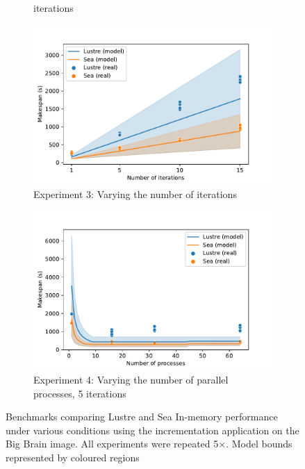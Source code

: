 \documentclass[10pt,journal,compsoc]{IEEEtran}
\begin{document}
\begin{figure}
\begin{subfigure}{\columnwidth}
{        iterations}\label{fig:sea-comp:disks}
    \end{subfigure}
    \begin{subfigure}{\columnwidth}
        \centering
        \captionsetup{width=.85\linewidth}
        \includegraphics[width=\linewidth]{figures/iterations.pdf}
        \caption{Experiment 3: Varying the number of
        iterations}\label{fig:sea-comp:iterations}
    \end{subfigure}
    \begin{subfigure}{\columnwidth}
        \centering
        \captionsetup{width=.85\linewidth}
        \includegraphics[width=\linewidth]{figures/threads.pdf}
        \caption{Experiment 4: Varying the number of parallel processes, 5
        iterations}\label{fig:sea-comp:processes}
    \end{subfigure}
    \caption{Benchmarks comparing Lustre and Sea In-memory performance under
    various conditions using the incrementation application on the Big Brain
    image. All experiments were repeated 5$\times$. Model bounds represented by
    coloured regions}
    \label{fig:sea-comp:benchmarks}
    \end{figure}
\end{document}
